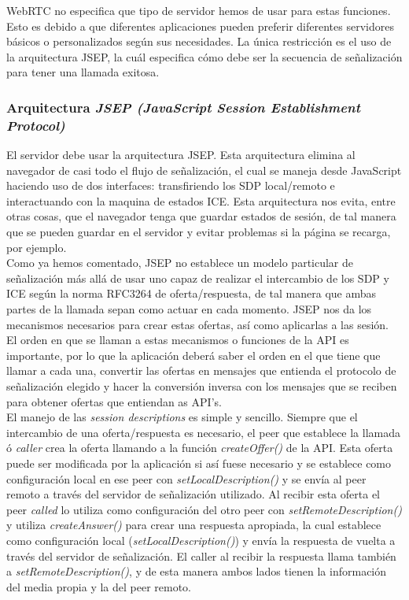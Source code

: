 WebRTC no especifica que tipo de servidor hemos de usar para estas funciones. Esto es debido a que diferentes aplicaciones pueden preferir diferentes servidores básicos o personalizados según sus necesidades. La única restricción es el uso de la arquitectura JSEP, la cuál especifica cómo debe ser la secuencia de señalización para tener una llamada exitosa.

\subsubsection{Arquitectura \textit{JSEP (JavaScript Session Establishment Protocol)}}

El servidor debe usar la arquitectura JSEP. Esta arquitectura elimina al navegador de casi todo el flujo de señalización, el cual se maneja desde JavaScript haciendo uso de dos interfaces: transfiriendo los SDP local/remoto e interactuando con la maquina de estados ICE. Esta arquitectura nos evita, entre otras cosas, que el navegador tenga que guardar estados de sesión, de tal manera que se pueden guardar en el servidor y evitar problemas si la página se recarga, por ejemplo. \\

Como ya hemos comentado, JSEP no establece un modelo particular de señalización más allá de usar uno capaz de realizar el intercambio de los SDP y ICE según la norma RFC3264 de oferta/respuesta, de tal manera que ambas partes de la llamada sepan como actuar en cada momento. JSEP nos da los mecanismos necesarios para crear estas ofertas, así como aplicarlas a las sesión.\\

El orden en que se llaman a estas mecanismos o funciones de la API es importante, por lo que la aplicación deberá saber el orden en el que tiene que llamar a cada una, convertir las ofertas en mensajes que entienda el protocolo de señalización elegido y hacer la conversión inversa con los mensajes que se reciben para obtener ofertas que entiendan as API's.\\

El manejo de las \textit{session descriptions} es simple y sencillo. Siempre que el intercambio de una oferta/respuesta es necesario, el peer que establece la llamada ó \textit{caller} crea la oferta llamando a la función \emph{createOffer()} de la API. Esta oferta puede ser modificada por la aplicación si así fuese necesario y se establece como configuración local en ese peer con \emph{setLocalDescription()} y se envía al peer remoto a través del servidor de señalización utilizado. Al recibir esta oferta el peer \textit{called} lo utiliza como configuración del otro peer con \emph{setRemoteDescription()} y utiliza \emph{createAnswer()} para crear una respuesta apropiada, la cual establece como configuración local (\emph{setLocalDescription()}) y envía la respuesta de vuelta a través del servidor de señalización. El caller al recibir la respuesta llama también a \emph{setRemoteDescription()}, y de esta manera ambos lados tienen la información del media propia y la del peer remoto.\\


